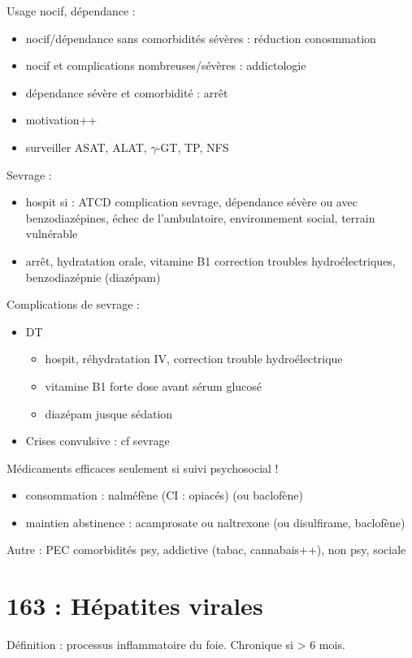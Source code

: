 \documentclass[11pt]{article}
\begin{document}
Usage nocif, dépendance :
\begin{itemize}
\item nocif/dépendance sans comorbidités sévères : réduction conosmmation
\item nocif et complications nombreuses/sévères : addictologie
\item dépendance sévère et comorbidité : arrêt
\item motivation++
\item surveiller ASAT, ALAT, \(\gamma\)-GT, TP, NFS
\end{itemize}

Sevrage : 
\begin{itemize}
\item hospit si : ATCD complication sevrage, dépendance sévère ou avec
benzodiazépines, échec de l'ambulatoire, environnement social, terrain
vulnérable
\item arrêt, hydratation orale, vitamine B1 \textpm{} correction troubles
hydroélectriques, \textpm{} benzodiazépnie (diazépam)
\end{itemize}

Complications de sevrage :
\begin{itemize}
\item DT
\begin{itemize}
\item hospit, réhydratation IV, correction trouble hydroélectrique
\item vitamine B1 forte dose avant sérum glucosé
\item diazépam jusque sédation
\end{itemize}
\item Crises convulsive : cf sevrage
\end{itemize}

Médicaments efficaces seulement si suivi psychosocial !
\begin{itemize}
\item \dec{} consommation : nalméfène (CI : opiacés) (ou baclofène)
\item maintien abstinence : acamprosate ou naltrexone (ou disulfirame, baclofène)
\end{itemize}

Autre : PEC comorbidités psy, addictive (tabac, cannabais++), non psy, sociale
\section{163 : Hépatites virales}
\label{sec:org170d341}
Définition : processus inflammatoire du foie. Chronique si > 6 mois.
\end{document}

